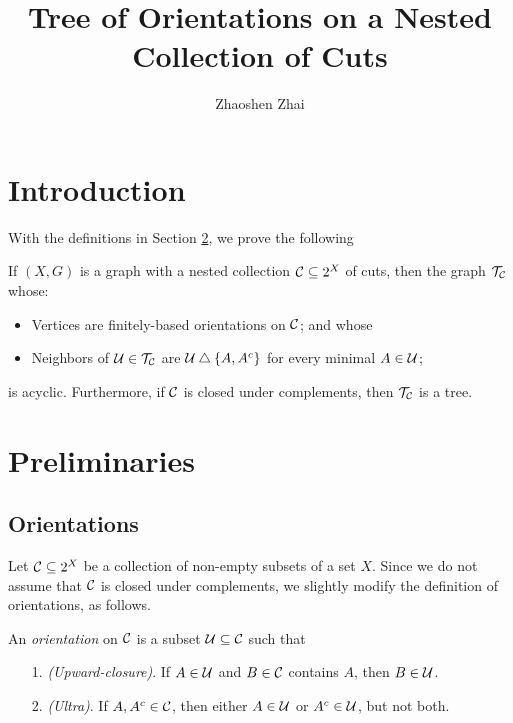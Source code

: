 \documentclass{amsart}
\begin{document}
    \title{Tree of Orientations on a Nested Collection of Cuts}
    \author{Zhaoshen Zhai}
    \maketitle

    \section{Introduction}

    With the definitions in Section \ref{prelim}, we prove the following
    \begin{theorem}
        If $(X,G)$ is a graph with a nested collection $\mathcal{C}\subseteq2^X$ of cuts, then the graph $\mathcal{T}_{\mathcal{C}}$ whose:
        \begin{itemize}
            \item Vertices are finitely-based orientations on $\mathcal{C}$; and whose
            \item Neighbors of $\mathcal{U}\in\mathcal{T}_{\mathcal{C}}$ are $\mathcal{U}\bigtriangleup\left\{A,A^c\right\}$ for every minimal $A\in\mathcal{U}$;
        \end{itemize}
        is acyclic. Furthermore, if $\mathcal{C}$ is closed under complements, then $\mathcal{T}_{\mathcal{C}}$ is a tree.
    \end{theorem}

    \section{Preliminaries}\label{prelim}

    \subsection{Orientations}

    Let $\mathcal{C}\subseteq2^X$ be a collection of non-empty subsets of a set $X$. Since we do not assume that $\mathcal{C}$ is closed under complements, we slightly modify the definition of orientations, as follows.

    \begin{definition}
        An \textit{orientation} on $\mathcal{C}$ is a subset $\mathcal{U}\subseteq\mathcal{C}$ such that
        \begin{enumerate}
            \item[1.] \textit{(Upward-closure)}. If $A\in\mathcal{U}$ and $B\in\mathcal{C}$ contains $A$, then $B\in\mathcal{U}$.
            \item[2.] \textit{(Ultra)}. If $A,A^c\in\mathcal{C}$, then either $A\in\mathcal{U}$ or $A^c\in\mathcal{U}$, but not both.
        \end{enumerate}
    \end{definition}
\end{document}
